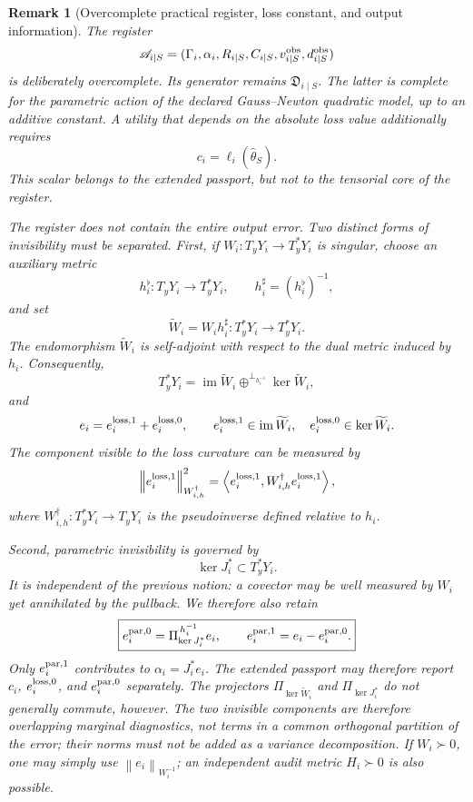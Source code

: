 \documentclass[10pt,a4paper]{article}
\newtheorem{remark}[theorem]{Remark}
\newcommand{\Ker}{\operatorname{ker}}
\newcommand{\Img}{\operatorname{im}}
\newcommand{\norm}[1]{\left\lVert #1\right\rVert}
\newcommand{\inner}[2]{\left\langle #1,#2\right\rangle}
\newcommand{\Areg}{\mathscr A}
\newcommand{\Jreg}{\mathfrak D}
\begin{document}
\begin{remark}[Overcomplete practical register, loss constant, and output information]
The register
\[
\Areg_{i\mid S}
=(\Gamma_i,\alpha_i,R_{i\mid S},C_{i\mid S},v_{i\mid S}^{\rm obs},d_{i\mid S}^{\rm obs})
\]
is deliberately overcomplete. Its generator remains $\Jreg_{i\mid S}$. The latter is complete for the \emph{parametric action of the declared Gauss--Newton quadratic model, up to an additive constant}. A utility that depends on the absolute loss value additionally requires
\[
c_i=\ell_i(\widehat\theta_S).
\]
This scalar belongs to the extended passport, but not to the tensorial core of the register.

The register does not contain the entire output error. Two distinct forms of invisibility must be separated. First, if $W_i:T_yY_i\to T_y^*Y_i$ is singular, choose an auxiliary metric
\[
h_i^\flat:T_yY_i\longrightarrow T_y^*Y_i,
\qquad h_i^\sharp=(h_i^\flat)^{-1},
\]
and set
\[
\widetilde W_i=W_i h_i^\sharp:T_y^*Y_i\longrightarrow T_y^*Y_i.
\]
The endomorphism $\widetilde W_i$ is self-adjoint with respect to the dual metric induced by $h_i$. Consequently,
\[
T_y^*Y_i=\Img\widetilde W_i\oplus^{\perp_{h_i^{-1}}}\Ker\widetilde W_i,
\]
and
\[
e_i=e_i^{\rm loss,1}+e_i^{\rm loss,0},
\qquad
e_i^{\rm loss,1}\in\Img\widetilde W_i,
\quad
e_i^{\rm loss,0}\in\Ker\widetilde W_i.
\]
The component visible to the loss curvature can be measured by
\[
\norm{e_i^{\rm loss,1}}_{W_{i,h}^{\dagger}}^2
=\inner{e_i^{\rm loss,1}}{W_{i,h}^{\dagger}e_i^{\rm loss,1}},
\]
where $W_{i,h}^{\dagger}:T_y^*Y_i\to T_yY_i$ is the pseudoinverse defined relative to $h_i$.

Second, parametric invisibility is governed by
\[
\Ker J_i^*\subset T_y^*Y_i.
\]
It is independent of the previous notion: a covector may be well measured by $W_i$ yet annihilated by the pullback. We therefore also retain
\[
\boxed{
 e_i^{\rm par,0}
 =\Pi_{\Ker J_i^*}^{\,h_i^{-1}}e_i,
 \qquad
 e_i^{\rm par,1}=e_i-e_i^{\rm par,0}.
}
\]
Only $e_i^{\rm par,1}$ contributes to $\alpha_i=J_i^*e_i$. The extended passport may therefore report $c_i$, $e_i^{\rm loss,0}$, and $e_i^{\rm par,0}$ separately. The projectors $\Pi_{\Ker\widetilde W_i}$ and $\Pi_{\Ker J_i^*}$ do not generally commute, however. The two invisible components are therefore overlapping marginal diagnostics, not terms in a common orthogonal partition of the error; their norms must not be added as a variance decomposition. If $W_i\succ0$, one may simply use $\norm{e_i}_{W_i^{-1}}$; an independent audit metric $H_i\succ0$ is also possible.
\end{remark}
\end{document}
